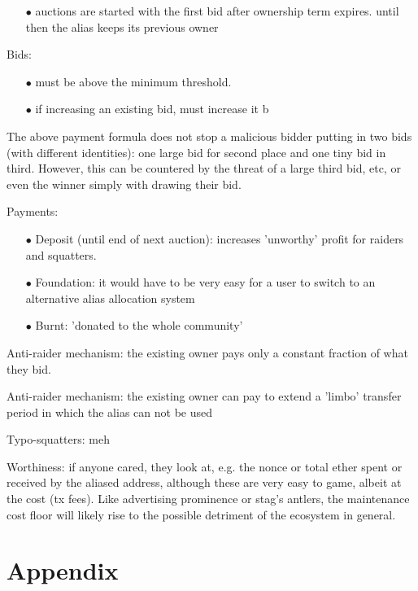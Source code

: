 \documentclass[10pt,a4paper]{article}
\begin{document}
{\begin{enumerate}
\item[$\bullet$] auctions are started with the first bid after ownership term expires. until then the alias keeps its previous owner 
\end{enumerate}

Bids:

\begin{enumerate}
\item[$\bullet$] must be above the minimum threshold.
\item[$\bullet$] if increasing an existing bid, must increase it b
\end{enumerate}

The above payment formula does not stop a malicious bidder putting in two bids (with different identities): one large bid for second place and one tiny bid in third. However, this can be countered by the threat of a large third bid, etc, or even the winner simply with drawing their bid.



Payments:

\begin{enumerate}
\item[$\bullet$] Deposit (until end of next auction): increases 'unworthy' profit for raiders and squatters.
\item[$\bullet$] Foundation: it would have to be very easy for a user to switch to an alternative alias allocation system
\item[$\bullet$] Burnt: 'donated to the whole community'
\end{enumerate}

Anti-raider mechanism: the existing owner pays only a constant fraction of what they bid.

Anti-raider mechanism: the existing owner can pay to extend a 'limbo' transfer period in which the alias can not be used

Typo-squatters: meh

Worthiness: if anyone cared, they look at, e.g. the nonce or total ether spent or received by the aliased address, although these are very easy to game, albeit at the cost (tx fees). Like advertising prominence or stag's antlers, the maintenance cost floor will likely rise to the possible detriment of the ecosystem in general.


\section*{Appendix}

}
\end{document}
